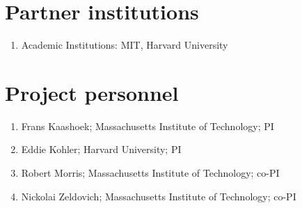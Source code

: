 \section*{Partner institutions}

\begin{enumerate}
\item Academic Institutions: MIT, Harvard University
\end{enumerate}

\section*{Project personnel}

\begin{enumerate}
\item Frans Kaashoek; Massachusetts Institute of Technology; PI
\item Eddie Kohler; Harvard University; PI
\item Robert Morris; Massachusetts Institute of Technology; co-PI
\item Nickolai Zeldovich; Massachusetts Institute of Technology; co-PI
\end{enumerate}
